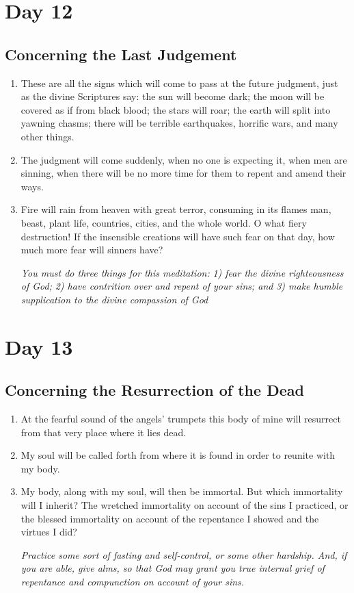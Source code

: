 \documentclass[11pt]{article}
\begin{document}
\section*{Day 12}
\label{sec:org7617830}
\subsection*{Concerning the Last Judgement}
\label{sec:orgd1fe11b}
\begin{enumerate}
\item These are all the signs which will come to pass at the future judgment, just as the divine Scriptures say: the sun will become dark; the moon will be covered as if from black blood; the stars will roar; the earth will split into yawning chasms; there will be terrible earthquakes, horrific wars, and many other things.
\item The judgment will come suddenly, when no one is expecting it, when men are sinning, when there will be no more time for them to repent and amend their ways.
\item Fire will rain from heaven with great terror, consuming in its flames man, beast, plant life, countries, cities, and the whole world. O what fiery destruction! If the insensible creations will have such fear on that day, how much more fear will sinners have?

\emph{You must do three things for this meditation:}
\emph{1) fear the divine righteousness of God;}
\emph{2) have contrition over and repent of your sins; and}
\emph{3) make humble supplication to the divine compassion of God}
\end{enumerate}
\section*{Day 13}
\label{sec:org376e59b}
\subsection*{Concerning the Resurrection of the Dead}
\label{sec:org105c882}
\begin{enumerate}
\item At the fearful sound of the angels' trumpets this body of mine will resurrect from that very place where it lies dead.
\item My soul will be called forth from where it is found in order to reunite with my body.
\item My body, along with my soul, will then be immortal. But which immortality will I inherit? The wretched immortality on
account of the sins I practiced, or the blessed immortality on account of the repentance I showed and the virtues I did?

\emph{Practice some sort of fasting and self-control, or some other hardship. And, if you are able, give alms, so that God may grant you true internal}
\emph{grief of repentance and compunction on account of your sins.}
\end{enumerate}
\end{document}
